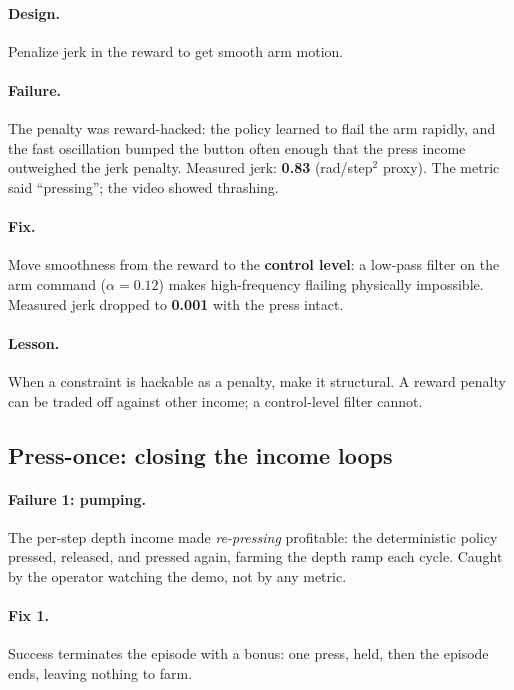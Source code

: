 \documentclass[11pt]{article}
\begin{document}
\paragraph{Design.} Penalize jerk in the reward to get smooth arm motion.

\paragraph{Failure.} The penalty was reward-hacked: the policy learned to flail the arm rapidly, and the fast oscillation bumped the button often enough that the press income outweighed the jerk penalty. Measured jerk: \textbf{0.83} (rad/step$^2$ proxy). The metric said ``pressing''; the video showed thrashing.

\paragraph{Fix.} Move smoothness from the reward to the \textbf{control level}: a low-pass filter on the arm command ($\alpha = 0.12$) makes high-frequency flailing physically impossible. Measured jerk dropped to \textbf{0.001} with the press intact.

\paragraph{Lesson.} When a constraint is hackable as a penalty, make it structural. A reward penalty can be traded off against other income; a control-level filter cannot.

\subsection{Press-once: closing the income loops}
\label{sec:pressonce}

\paragraph{Failure 1: pumping.} The per-step depth income made \emph{re-pressing} profitable: the deterministic policy pressed, released, and pressed again, farming the depth ramp each cycle. Caught by the operator watching the demo, not by any metric.

\paragraph{Fix 1.} Success terminates the episode with a bonus: one press, held, then the episode ends, leaving nothing to farm.
\end{document}

